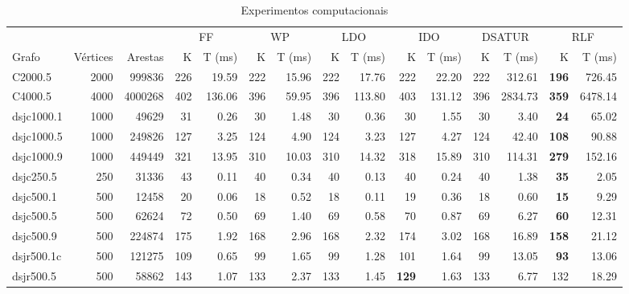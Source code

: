 \begin{table*}[tbh]
    \caption{Experimentos computacionais}
    \label{tab:experiments}
    \begin{adjustbox}{width=\textwidth}%
    \small
    \centering
    \begin{minipage}[b]{\textwidth}
        \centering
\begin{tabular}{@{} lrrrrrrrrrrrrrr @{}}
\toprule
& & & \multicolumn{2}{c}{FF} & \multicolumn{2}{c}{WP} & \multicolumn{2}{c}{LDO} & \multicolumn{2}{c}{IDO} & \multicolumn{2}{c}{DSATUR} & \multicolumn{2}{c}{RLF}\\
\cmidrule(lr){4-5}\cmidrule(lr){6-7}\cmidrule(lr){8-9}\cmidrule(lr){10-11}\cmidrule(lr){12-13}\cmidrule(lr){14-15}
Grafo & Vértices & Arestas & K & T (ms) & K & T (ms) & K & T (ms) & K & T (ms) & K & T (ms) & K & T (ms) \\
\midrule
C2000.5 & 2000 & 999836 & 226 & 19.59 & 222 & 15.96 & 222 & 17.76 & 222 & 22.20 & 222 & 312.61 & \textbf{196} & 726.45 \\
C4000.5 & 4000 & 4000268 & 402 & 136.06 & 396 & 59.95 & 396 & 113.80 & 403 & 131.12 & 396 & 2834.73 & \textbf{359} & 6478.14 \\
dsjc1000.1 & 1000 & 49629 & 31 & 0.26 & 30 & 1.48 & 30 & 0.36 & 30 & 1.55 & 30 & 3.40 & \textbf{24} & 65.02 \\
dsjc1000.5 & 1000 & 249826 & 127 & 3.25 & 124 & 4.90 & 124 & 3.23 & 127 & 4.27 & 124 & 42.40 & \textbf{108} & 90.88 \\
dsjc1000.9 & 1000 & 449449 & 321 & 13.95 & 310 & 10.03 & 310 & 14.32 & 318 & 15.89 & 310 & 114.31 & \textbf{279} & 152.16 \\
dsjc250.5 & 250 & 31336 & 43 & 0.11 & 40 & 0.34 & 40 & 0.13 & 40 & 0.24 & 40 & 1.38 & \textbf{35} & 2.05 \\
dsjc500.1 & 500 & 12458 & 20 & 0.06 & 18 & 0.52 & 18 & 0.11 & 19 & 0.36 & 18 & 0.60 & \textbf{15} & 9.29 \\
dsjc500.5 & 500 & 62624 & 72 & 0.50 & 69 & 1.40 & 69 & 0.58 & 70 & 0.87 & 69 & 6.27 & \textbf{60} & 12.31 \\
dsjc500.9 & 500 & 224874 & 175 & 1.92 & 168 & 2.96 & 168 & 2.32 & 174 & 3.02 & 168 & 16.89 & \textbf{158} & 21.12 \\
dsjr500.1c & 500 & 121275 & 109 & 0.65 & 99 & 1.65 & 99 & 1.28 & 101 & 1.64 & 99 & 13.05 & \textbf{93} & 13.06 \\
dsjr500.5 & 500 & 58862 & 143 & 1.07 & 133 & 2.37 & 133 & 1.45 & \textbf{129} & 1.63 & 133 & 6.77 & 132 & 18.29 \\

\end{tabular}
\end{minipage}
\end{adjustbox}
\end{table*}
